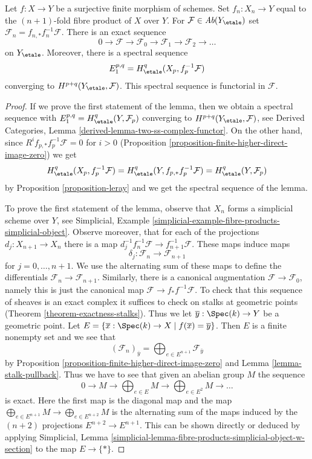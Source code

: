 \begin{lemma}
\label{lemma-cohomological-descent-finite}
Let $f : X \to Y$ be a surjective finite morphism of schemes.
Set $f_n : X_n \to Y$ equal to the $(n + 1)$-fold fibre product
of $X$ over $Y$. For $\mathcal{F} \in \textit{Ab}(Y_\etale)$ set
$\mathcal{F}_n = f_{n, *}f_n^{-1}\mathcal{F}$. There is an exact
sequence
$$
0 \to \mathcal{F} \to \mathcal{F}_0 \to \mathcal{F}_1 \to
\mathcal{F}_2 \to \ldots
$$
on $Y_\etale$. Moreover, there is a spectral sequence
$$
E_1^{p, q} = H^q_\etale(X_p, f_p^{-1}\mathcal{F})
$$
converging to $H^{p + q}(Y_\etale, \mathcal{F})$.
This spectral sequence is functorial in $\mathcal{F}$.
\end{lemma}

\begin{proof}
If we prove the first statement of the lemma, then we obtain a spectral
sequence with $E_1^{p, q} = H^q_\etale(Y, \mathcal{F}_p)$ converging
to $H^{p + q}(Y_\etale, \mathcal{F})$, see
Derived Categories, Lemma \ref{derived-lemma-two-ss-complex-functor}.
On the other hand, since
$R^if_{p, *}f_p^{-1}\mathcal{F} = 0$ for $i > 0$
(Proposition \ref{proposition-finite-higher-direct-image-zero})
we get
$$
H^q_\etale(X_p, f_p^{-1}\mathcal{F}) =
H^q_\etale(Y, f_{p, *}f_p^{-1} \mathcal{F}) =
H^q_\etale(Y, \mathcal{F}_p)
$$
by Proposition \ref{proposition-leray}
and we get the spectral sequence of the lemma.

\medskip\noindent
To prove the first statement of the lemma, observe that
$X_n$ forms a simplicial scheme over $Y$, see
Simplicial, Example \ref{simplicial-example-fibre-products-simplicial-object}.
Observe moreover, that for each of the projections
$d_j : X_{n + 1} \to X_n$ there is a map
$d_j^{-1} f_n^{-1}\mathcal{F} \to f_{n + 1}^{-1}\mathcal{F}$.
These maps induce maps
$$
\delta_j : \mathcal{F}_n \to \mathcal{F}_{n + 1}
$$
for $j = 0, \ldots, n + 1$. We use the alternating sum of these maps
to define the differentials $\mathcal{F}_n \to \mathcal{F}_{n + 1}$.
Similarly, there is a canonical augmentation $\mathcal{F} \to \mathcal{F}_0$,
namely this is just the canonical map $\mathcal{F} \to f_*f^{-1}\mathcal{F}$.
To check that this sequence of sheaves is an exact complex it suffices
to check on stalks at geometric points (Theorem \ref{theorem-exactness-stalks}).
Thus we let $\overline{y} : \Spec(k) \to Y$ be a geometric point. Let
$E = \{\overline{x} : \Spec(k) \to X \mid f(\overline{x}) = \overline{y}\}$.
Then $E$ is a finite nonempty set and we see that
$$
(\mathcal{F}_n)_{\overline{y}} =
\bigoplus\nolimits_{e \in E^{n + 1}} \mathcal{F}_{\overline{y}}
$$
by Proposition \ref{proposition-finite-higher-direct-image-zero}
and Lemma \ref{lemma-stalk-pullback}.
Thus we have to see that given an abelian group $M$ the sequence
$$
0 \to M \to \bigoplus\nolimits_{e \in E} M \to
\bigoplus\nolimits_{e \in E^2} M \to \ldots
$$
is exact. Here the first map is the diagonal map and the map
$\bigoplus_{e \in E^{n + 1}} M  \to \bigoplus_{e \in E^{n + 2}} M$
is the alternating sum of the maps induced by the $(n + 2)$
projections $E^{n + 2} \to E^{n + 1}$. This can be shown directly
or deduced by applying Simplicial, Lemma
\ref{simplicial-lemma-fibre-products-simplicial-object-w-section}
to the map $E \to \{*\}$.
\end{proof}